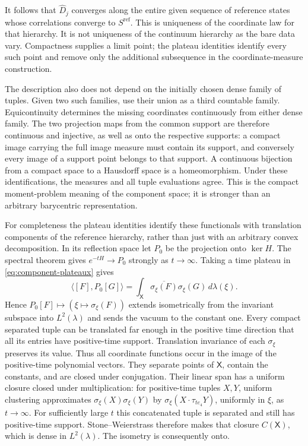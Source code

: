 \documentclass[11pt,letterpaper,reqno]{amsart}
\theoremstyle{definition}
\theoremstyle{remark}
\begin{document}
It follows that $\widehat D_j$ converges along the entire given
sequence of reference states whose correlations converge to
$S^{\mathrm{ref}}$. This is uniqueness of the coordinate law for
that hierarchy. It is not uniqueness of the continuum hierarchy as
the bare data vary. Compactness supplies a limit point; the plateau
identities identify every such point and remove only the additional
subsequence in the coordinate-measure construction.

The description also does not depend on the initially chosen dense
family of tuples. Given two such families, use their union as a third
countable family. Equicontinuity determines the missing coordinates
continuously from either dense family. The two projection maps from
the common support are therefore continuous and injective, as well
as onto the respective supports: a compact image carrying the full
image measure must contain its support, and conversely every image
of a support point belongs to that support. A continuous bijection
from a compact space to a Hausdorff space is a homeomorphism. Under
these identifications, the measures and all tuple evaluations agree.
This is the compact moment-problem meaning of the component space;
it is stronger than an arbitrary barycentric representation.


For completeness the plateau identities identify these functionals with
translation components of the reference hierarchy, rather than just
with an arbitrary convex decomposition. In its reflection space let
$P_0$ be the projection onto $\ker H$. The spectral theorem gives
$e^{-tH}\to P_0$ strongly as $t\to\infty$. Taking a time plateau in
\eqref{eq:component-plateaux} gives
\[
 \langle[F],P_0[G]\rangle
       =\int_{\mathsf X}\overline{\sigma_\xi(F)}
                            \sigma_\xi(G)\,d\lambda(\xi).
\]
Hence $P_0[F]\mapsto(\xi\mapsto\sigma_\xi(F))$ extends isometrically
from the invariant subspace into $L^2(\lambda)$ and sends the vacuum
to the constant one. Every compact separated tuple can be translated
far enough in the positive time direction that all its entries have
positive-time support. Translation invariance of each $\sigma_\xi$
preserves its value. Thus all coordinate functions occur in the image
of the positive-time polynomial vectors. They separate points of
$\mathsf X$, contain the constants, and are closed under conjugation.
Their linear span has a uniform closure closed under multiplication:
for positive-time tuples $X,Y$, uniform clustering approximates
$\sigma_\xi(X)\sigma_\xi(Y)$ by
$\sigma_\xi(X\cdot\tau_{te_4}Y)$, uniformly in $\xi$, as $t\to\infty$.
For sufficiently large $t$ this concatenated tuple is separated and
still has positive-time support. Stone--Weierstrass
therefore makes that closure $C(\mathsf X)$, which is dense in
$L^2(\lambda)$. The isometry is consequently onto.
\end{document}

